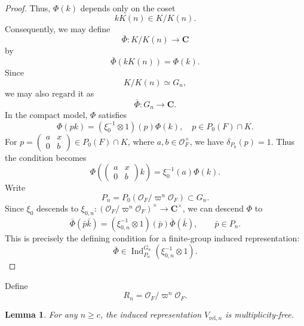 \documentclass[11pt]{amsart}
\newtheorem {lemma}      [theorem]    {Lemma}
\renewcommand{\rm}{\mathrm}
\theoremstyle{definition}
\numberwithin{equation}{section}
\begin{document}
\begin{proof}
		
		Thus, \(\Phi(k)\) depends only on the coset
		\[
		kK(n) \in K/K(n).
		\]
		Consequently, we may define
		\[
		\bar{\Phi} : K/K(n) \to \mathbf{C}
		\]
		by
		\[
		\bar{\Phi}(kK(n)) = \Phi(k).
		\]
		Since
		\[
		K/K(n) \simeq G_n,
		\]
		we may also regard it as
		\[
		\bar{\Phi} : G_n \to \mathbf{C}.
		\]
		In the compact model, \(\Phi\) satisfies
		\[
		\Phi(pk) = (\xi_0^{-1} \otimes 1)(p)\Phi(k), \quad p \in P_0(F) \cap K.
		\]
		For \(p = \begin{pmatrix} a & x \\ 0 & b \end{pmatrix} \in P_0(F) \cap K\), where \(a, b \in \mathcal{O}_F^\times\), we have \(\delta_{P_0}(p) = 1\). Thus the condition becomes
		\[
		\Phi\left(\begin{pmatrix} a & x \\ 0 & b \end{pmatrix} k\right) = \xi_0^{-1}(a)\Phi(k).
		\]
		Write
		\[
		P_n = P_0(\mathcal{O}_F/\varpi^n\mathcal{O}_F) \subset G_n.
		\]
		Since \(\xi_0\) descends to \(\xi_{0,n} : (\mathcal{O}_F/\varpi^n\mathcal{O}_F)^\times \to \mathbf{C}^\times\), we can descend \(\Phi\) to
		\[
		\bar{\Phi}(\bar{p}\bar{k}) = (\xi_{0,n}^{-1} \otimes 1)(\bar{p})\bar{\Phi}(\bar{k}), \qquad \bar{p} \in P_n.
		\]
		This is precisely the defining condition for a finite-group induced representation:
		\[
		\bar{\Phi} \in \operatorname{Ind}_{P_n}^{G_n}(\xi_{0,n}^{-1} \otimes 1).
		\]
	\end{proof}
	Define\[R_n=\mathcal{O}_F/\varpi^n\mathcal{O}_F.\]
	\begin{lemma}
		For any \(n\ge c\), the induced representation \(V_{\rm{rel},n}\) is multiplicity-free.
	\end{lemma}
\end{document}
